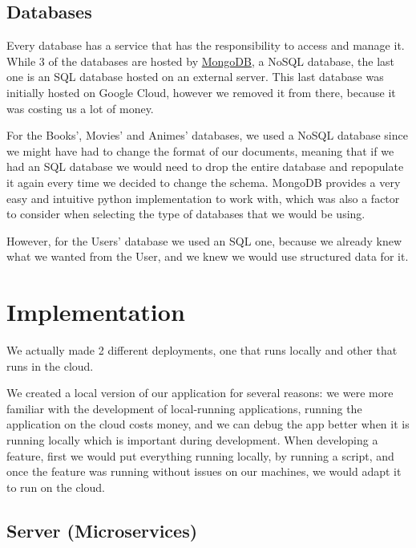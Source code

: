 \documentclass[oneside]{article}
\newcommand*\fpar{\hspace{1ex}}
\begin{document}
  \subsection{Databases}
  \fpar Every database has a service that has the responsibility to access and manage it. While 3 of the databases are hosted by \href{https://www.mongodb.com/}{MongoDB}, a NoSQL database, the last one is an SQL database hosted on an external server. This last database was initially hosted on Google Cloud, however we removed it from there, because it was costing us a lot of money.
  \par For the Books', Movies' and Animes' databases, we used a NoSQL database since we might have had to change the format of our documents, meaning that if we had an SQL database we would need to drop the entire database and repopulate it again every time we decided to change the schema. MongoDB provides a very easy and intuitive python implementation to work with, which was also a factor to consider when selecting the type of databases that we would be using.
  \par However, for the Users' database we used an SQL one, because we already knew what we wanted from the User, and we knew we would use structured data for it.

\section{Implementation}
\label{sec:implementation}
\fpar We actually made 2 different deployments, one that runs locally and other that runs in the cloud.
\par We created a local version of our application for several reasons: we were more familiar with the development of local-running applications, running the application on the cloud costs money, and we can debug the app better when it is running locally which is important during development. When developing a feature, first we would put everything running locally, by running a script, and once the feature was running without issues on our machines, we would adapt it to run on the cloud.

  \subsection{Server (Microservices)}
\end{document}
